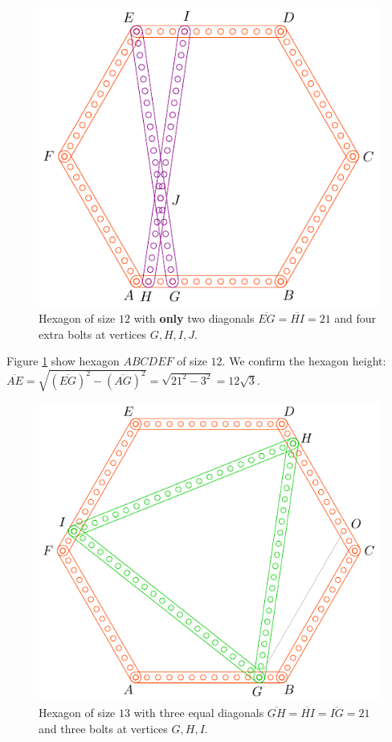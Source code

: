 \documentclass[11pt]{article}
\begin{document}
\begin{figure}[H]
\centering
\includegraphics[scale=1]{12/hexa-12a}
\caption{Hexagon of size $12$ with \textbf{only} two diagonals $\overline{EG} = \overline{HI} = 21$ and four extra bolts at vertices $G,H,I,J$.}
\label{fig:12a}
\end{figure}

Figure \ref{fig:12a} show hexagon $ABCDEF$ of size $12$. We confirm the hexagon height: $\overline{AE} = \sqrt{(\overline{EG})^2 - (\overline{AG})^2} = \sqrt{21^2 - 3^2} = 12\sqrt3$.


\begin{figure}[H]
\centering
\includegraphics[scale=1]{13/hexa-13a}
\caption{Hexagon of size $13$ with three equal diagonals $\overline{GH} = \overline{HI} = \overline{IG} = 21$ and three bolts at vertices $G,H,I$.}
\label{fig:13a}
\end{figure}
\end{document}
